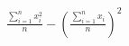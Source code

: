 \documentclass{standalone}
\begin{document}
$\displaystyle
\frac{\sum_{i=1}^n x_{i}^2}{n}-\left(\frac{\sum_{i=1}^n x_i}{n}\right)^2
$
\end{document}
